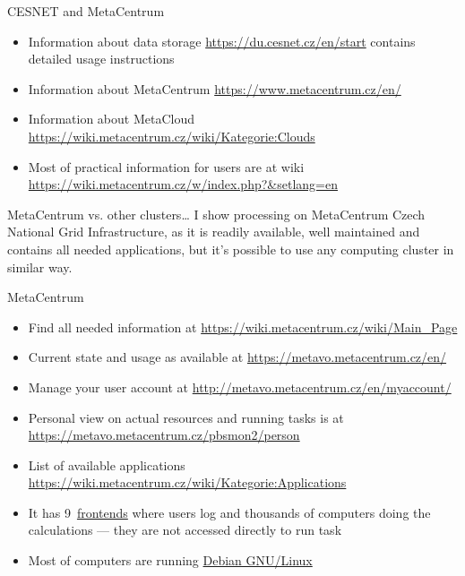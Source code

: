 \documentclass[compress, ucs, xelatex, 11pt, xcolor=x11names, aspectratio=1609,
	hyperref={
		bookmarks=true,
		unicode=true,
		colorlinks=true,
		pdftitle={HybSeq course},
		plainpages=false,
		pdfauthor={Vojtech Zeisek},
		pdfsubject={Practical processing of HybSeq target enrichment sequencing data on computing grids like MetaCentrum},
		pdfcreator={XeLaTeX},
		pdfkeywords={BASH, command line, GNU, HybSeq, Linux, MetaCentrum, sequencing shell, target enrichment},
		linkcolor=Cyan2, %
		anchorcolor=Firebrick2, %
		citecolor=Firebrick2, %
		filecolor=Firebrick2, %
		menucolor=Firebrick2, %
		urlcolor=Chartreuse2, %
		pdftex},
	url={hyphens, lowtilde} %
	]{beamer}
\begin{document}
\begin{frame}[allowframebreaks]{CESNET and MetaCentrum}
\begin{itemize}
		\begin{itemize}
			\item To use MetaCentrum fill registration form \url{https://metavo.metacentrum.cz/en/application/form}
			\item To use data storage fill registration form \url{https://einfra.cesnet.cz/perun-registrar-fed/?vo=storage}
			\item After registration for MetaCentrum, user can join MetaCloud via \url{https://perun.metacentrum.cz/fed/registrar/?vo=meta&group=metacloud}
			\item Users not having access to \href{https://www.eduid.cz/en/index}{EduID} have to register first at HostelID \url{http://hostel.eduid.cz/en/index.html}
		\end{itemize}
		\item Information about data storage \url{https://du.cesnet.cz/en/start} contains detailed usage instructions
		\item Information about MetaCentrum \url{https://www.metacentrum.cz/en/}
		\item Information about MetaCloud \url{https://wiki.metacentrum.cz/wiki/Kategorie:Clouds}
		\item Most of practical information for users are at wiki \url{https://wiki.metacentrum.cz/w/index.php?&setlang=en}
	\end{itemize}
	\begin{alertblock}{MetaCentrum vs. other clusters\ldots}
		I show processing on MetaCentrum Czech National Grid Infrastructure, as it is readily available, well maintained and contains all needed applications, but it's possible to use any computing cluster in similar way.
	\end{alertblock}

\end{frame}

\begin{frame}{MetaCentrum}
	\begin{itemize}
		\item Find all needed information at \url{https://wiki.metacentrum.cz/wiki/Main_Page}
		\item Current state and usage as available at \url{https://metavo.metacentrum.cz/en/}
		\item Manage your user account at \url{http://metavo.metacentrum.cz/en/myaccount/}
		\item Personal view on actual resources and running tasks is at \url{https://metavo.metacentrum.cz/pbsmon2/person}
		\item List of available applications \url{https://wiki.metacentrum.cz/wiki/Kategorie:Applications}
		\item It has 9~\href{https://wiki.metacentrum.cz/wiki/Frontend}{frontends} where users log and thousands of computers doing the calculations --- they are not accessed directly to run task
		\item Most of computers are running \href{https://www.debian.org/}{Debian GNU/Linux}
	\end{itemize}
\end{frame}
\end{document}
